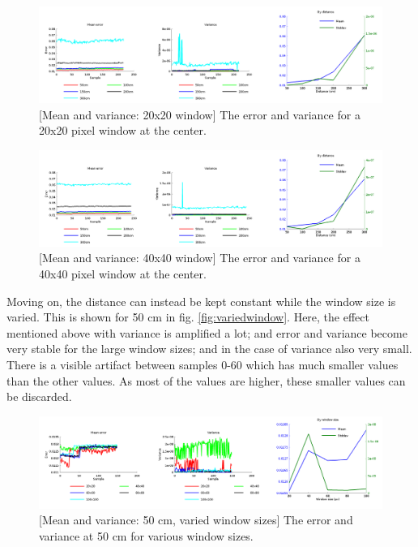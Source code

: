 \documentclass[11pt]{article}
\begin{document}
\begin{figure}[ht]
  \includegraphics[width=1\textwidth]{figures/20x20-plot.png}
  [Mean and variance: 20x20 window]{\label{fig:20x20} The
    error and variance for a 20x20 pixel window at the center.}
\end{figure}

\begin{figure}[ht]
  \includegraphics[width=1\textwidth]{figures/plot40x40.png}
  [Mean and variance: 40x40 window]{\label{fig:40x40} The
    error and variance for a 40x40 pixel window at the center.}
\end{figure}

Moving on, the distance can instead be kept constant while the window size is
varied. This is shown for 50 cm in fig.  \vref{fig:variedwindow}. Here, the
effect mentioned above with variance is amplified a lot; and error and variance
become very stable for the large window sizes; and in the case of variance also
very small. There is a visible artifact between samples 0-60 which has much
smaller values than the other values. As most of the values are higher, these
smaller values can be discarded. \par


\begin{figure}[ht]
  \centering
  \includegraphics[width=1\textwidth]{figures/plotwindowsizes.png}
  [Mean and variance: 50 cm, varied window
  sizes]{\label{fig:variedwindow} The error and variance at 50 cm for various
    window sizes.}
\end{figure}
\end{document}
